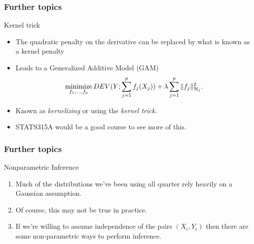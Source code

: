 \documentclass[handout]{beamer}
\newcommand{\minimize}{\mathop{\mathrm{minimize}}}
\begin{document}
   \begin{frame} \frametitle{Further topics}

   \begin{block}
   {Kernel trick}
       \begin{itemize}
       \item The quadratic penalty on the derivative
       can be replaced by what is known as a kernel penalty
       \item Leads to a Generalized Additive Model (GAM)
       $$
       \minimize_{f_1, \dots, f_p} DEV(Y;\sum_{j=1}^p f_j(X_j)) +
       \lambda \sum_{j=1}^p \|f_j\|^2_{{\cal H}_j}.
       $$
       \item Known as {\em kernelizing} or using the {\em kernel trick}.
       \item STATS315A would be a good course to see more of this.
       \end{itemize}
   \end{block}
   \end{frame}


   \begin{frame} \frametitle{Further topics}

   \begin{block}
   {Nonparametric Inference}

   \begin{enumerate}
   \item Much of the distributions we've been using all quarter
   rely heavily on a Gaussian assumption.
   \item Of course, this may not be true in practice.
   \item If we're willing to assume independence of the
   pairs $(X_i,Y_i)$ then there are some non-parametric ways to
   perform inference.
   \end{enumerate}
   \end{block}
   \end{frame}

\end{document}
